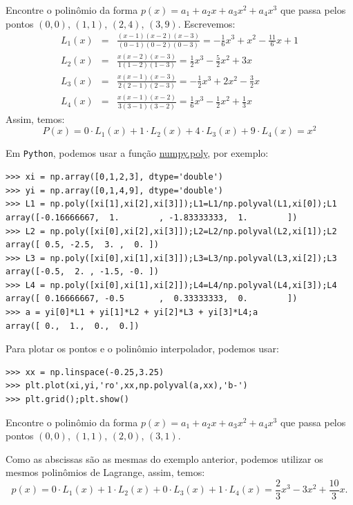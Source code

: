 \begin{ex}Encontre o polinômio da forma $p(x)=a_1+a_2x+a_3x^2+a_4x^3$ que passa pelos pontos $(0, 0)$, $(1, 1)$, $(2, 4)$, $(3, 9)$.
Escrevemos:
\begin{eqnarray*}
L_1(x)&=& \frac{(x-1)(x-2)(x-3)}{(0-1)(0-2)(0-3)}=-\frac{1}{6}x^3+x^2-\frac{11}{6}x+1\\
L_2(x)&=& \frac{x(x-2)(x-3)}{1(1-2)(1-3)}=\frac{1}{2}x^3-\frac{5}{2}x^2+3x\\
L_3(x)&=& \frac{x(x-1)(x-3)}{2(2-1)(2-3)}=-\frac{1}{2}x^3+2x^2-\frac{3}{2}x\\
L_4(x)&=& \frac{x(x-1)(x-2)}{3(3-1)(3-2)}=\frac{1}{6}x^3-\frac{1}{2}x^2+\frac{1}{3}x
\end{eqnarray*}
Assim, temos:
\begin{equation*}
  P(x)=0\cdot L_1(x)+1\cdot L_2(x)+4\cdot L_3(x)+9\cdot L_4(x)=x^2
\end{equation*}

\ifispython
Em \verb+Python+, podemos usar a função \href{https://docs.scipy.org/doc/numpy/reference/generated/numpy.poly.html}{numpy.poly}, por exemplo:
\begin{verbatim}
>>> xi = np.array([0,1,2,3], dtype='double')
>>> yi = np.array([0,1,4,9], dtype='double')
>>> L1 = np.poly([xi[1],xi[2],xi[3]]);L1=L1/np.polyval(L1,xi[0]);L1
array([-0.16666667,  1.        , -1.83333333,  1.        ])
>>> L2 = np.poly([xi[0],xi[2],xi[3]]);L2=L2/np.polyval(L2,xi[1]);L2
array([ 0.5, -2.5,  3. ,  0. ])
>>> L3 = np.poly([xi[0],xi[1],xi[3]]);L3=L3/np.polyval(L3,xi[2]);L3
array([-0.5,  2. , -1.5, -0. ])
>>> L4 = np.poly([xi[0],xi[1],xi[2]]);L4=L4/np.polyval(L4,xi[3]);L4
array([ 0.16666667, -0.5       ,  0.33333333,  0.        ])
>>> a = yi[0]*L1 + yi[1]*L2 + yi[2]*L3 + yi[3]*L4;a
array([ 0.,  1.,  0.,  0.])
\end{verbatim}
Para plotar os pontos e o polinômio interpolador, podemos usar:
\begin{verbatim}
>>> xx = np.linspace(-0.25,3.25)
>>> plt.plot(xi,yi,'ro',xx,np.polyval(a,xx),'b-')
>>> plt.grid();plt.show()
\end{verbatim}
\fi
\end{ex}

\begin{ex}
Encontre o polinômio da forma $p(x)=a_1+a_2x+a_3x^2+a_4x^3$ que passa pelos pontos $(0, 0)$, $(1, 1)$, $(2, 0)$, $(3, 1)$.
\end{ex}
\begin{sol}
Como as abscissas são as mesmas do exemplo anterior, podemos utilizar os mesmos polinômios de Lagrange, assim, temos:
\begin{equation*}
  p(x)=0\cdot L_1(x)+1\cdot L_2(x)+0\cdot L_3(x)+1\cdot L_4(x)=\frac{2}{3}x^3-3x^2+\frac{10}{3}x.
\end{equation*}
\end{sol}

